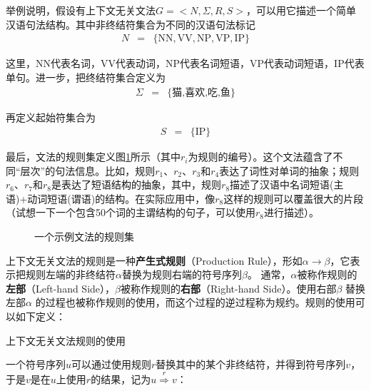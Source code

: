 \parinterval 举例说明，假设有上下文无关文法$G=<N,\varSigma,R,S>$，可以用它描述一个简单汉语句法结构。其中非终结符集合为不同的汉语句法标记
\begin{eqnarray}
N&=&\{\textrm{NN},\textrm{VV},\textrm{NP},\textrm{VP},\textrm{IP}\} \nonumber
\label{eq:3.4-1}
\end{eqnarray}

\noindent 这里，\textrm{NN}代表名词，\textrm{VV}代表动词，\textrm{NP}代表名词短语，\textrm{VP}代表动词短语，\textrm{IP}代表单句。进一步，把终结符集合定义为
\begin{eqnarray}
\varSigma &=& \{\text{猫,喜欢,吃,鱼}\} \nonumber
\label{eq:3.4-2}
\end{eqnarray}

再定义起始符集合为
\begin{eqnarray}
S&=&\{\textrm{IP}\} \nonumber
\label{eq:3.4-3}
\end{eqnarray}

\parinterval 最后，文法的规则集定义图\ref{fig:3.4-2}所示（其中$r_i$为规则的编号）。这个文法蕴含了不同“层次”的句法信息。比如，规则$r_1$、$r_2$、$r_3$和$r_4$表达了词性对单词的抽象；规则$r_6$、$r_7$和$r_8$是表达了短语结构的抽象，其中，规则$r_8$描述了汉语中名词短语(主语)+动词短语(谓语)的结构。在实际应用中，像$r_8$这样的规则可以覆盖很大的片段（试想一下一个包含50个词的主谓结构的句子，可以使用$r_8$进行描述）。

\begin{figure}[htp]
    \centering
 
 \caption{一个示例文法的规则集}
     \label{fig:3.4-2}
 \end{figure}

\parinterval 上下文无关文法的规则是一种{\small\sffamily\bfseries{产生式规则}}（Production Rule），形如$\alpha \to \beta $，它表示把规则左端的非终结符$\alpha$替换为规则右端的符号序列$\beta$。 通常，$\alpha$被称作规则的{\small\sffamily\bfseries{左部}}（Left-hand Side），$\beta$被称作规则的{\small\sffamily\bfseries{右部}}（Right-hand Side）。使用右部$\beta$ 替换左部$\alpha$ 的过程也被称作规则的使用，而这个过程的逆过程称为规约。规则的使用可以如下定义：

\vspace{0.5em}
\begin{definition} 上下文无关文法规则的使用

一个符号序列$u$可以通过使用规则$r$替换其中的某个非终结符，并得到符号序列$v$，于是$v$是在$u$上使用$r$的结果，记为$u \overset{r}{\Rightarrow} v$：
\begin{center}

\end{center}
\end{definition}

